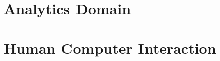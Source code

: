 \section{                  Analytics Domain                                   }



\section{                  Human Computer Interaction                         }




